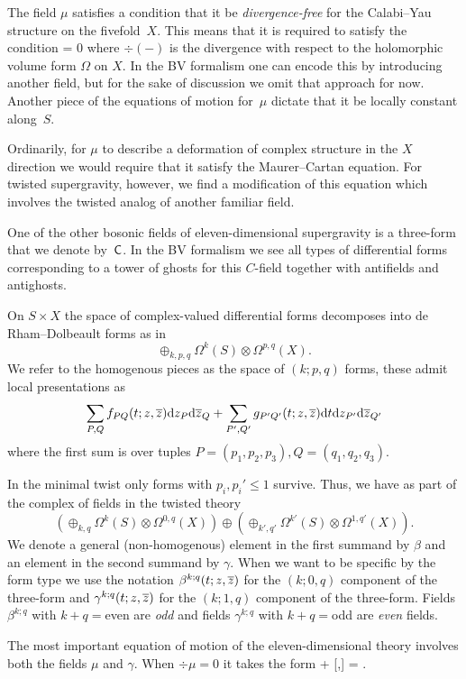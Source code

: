 \documentclass[11pt]{amsart}%
\begin{document}
The field $\mu$ satisfies a condition that it be {\em divergence-free} for the Calabi--Yau structure on the fivefold~$X$. 
This means that it is required to satisfy the condition 
\beqn
\div \mu = 0
\eeqn
where $\div(-)$ is the divergence with respect to the holomorphic volume form $\Omega$ on $X$.
In the BV formalism one can encode this by introducing another field, but for the sake of discussion we omit that approach for now.
Another piece of the equations of motion for~$\mu$ dictate that it be locally constant along~$S$.

Ordinarily, for $\mu$ to describe a deformation of complex structure in the $X$ direction we would require that it satisfy the Maurer--Cartan equation.
For twisted supergravity, however, we find a modification of this equation which involves the twisted analog of another familiar field.

One of the other bosonic fields of eleven-dimensional supergravity is a three-form that we denote by~$\sf C$.
In the BV formalism we see all types of differential forms corresponding to a tower of ghosts for this $C$-field together with antifields and antighosts. 
 
On $S \times X$ the space of complex-valued differential forms decomposes into de Rham--Dolbeault forms as in
\[
\oplus_{k,p,q} \Omega^k(S) \otimes \Omega^{p,q}(X) .
\]
We refer to the homogenous pieces as the space of $(k;p,q)$ forms, these admit local presentations as
\[
\sum_{P,Q} f_{PQ} (t;z,\overline{z}) {\rm d} z_P {\rm d} \overline{z}_Q + \sum_{P',Q'} g_{P'Q'}(t;z,\overline{z}) {\rm d} t {\rm d} z_{P'}{\rm d} \overline{z}_{Q'} 
\]
where the first sum is over tuples $P=(p_1,p_2,p_3),Q=(q_1,q_2,q_3)$.

In the minimal twist only forms with $p_i ,p_i'\leq 1$ survive. 
Thus, we have as part of the complex of fields in the twisted theory
\[
\left(\oplus_{k,q} \Omega^k(S) \otimes \Omega^{0,q}(X)\right) \oplus 
\left(\oplus_{k',q'} \Omega^{k'}(S) \otimes \Omega^{1,q'}(X)\right) .
\]
We denote a general (non-homogenous) element in the first summand by $\beta$ and an element in the second summand by $\gamma$.
When we want to be specific by the form type we use the notation $\beta^{k;q}(t;z,\overline{z})$ for the $(k;0,q)$ component of the three-form and $\gamma^{k;q}(t;z,\overline{z})$ for the $(k;1,q)$ component of the three-form.
Fields $\beta^{k;q}$ with $k+q = $even are {\em odd} and fields $\gamma^{k;q}$ with $k+q = $odd are {\em even} fields. 

The most important equation of motion of the eleven-dimensional theory involves both the fields $\mu$ and $\gamma$. 
When $\div \mu = 0$ it takes the form
\beqn\label{eqn:eom2}
\dbar \mu +  [\mu,\mu] = \del \gamma \del \gamma .
\eeqn
\end{document}
